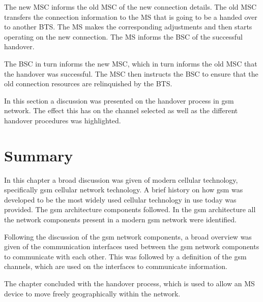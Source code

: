 \begin{description}
The new \gls{MSC} informs the old \gls{MSC} of the new connection details. The old \gls{MSC} transfers the connection information to the \gls{MS} that is going to be a handed over to another \gls{BTS}\@\cite{wirelesstelcoMullet}. The \gls{MS} makes the corresponding adjustments and then starts operating on the new connection. The \gls{MS} informs the \gls{BSC} of the successful handover\cite{wirelesstelcoMullet,GSMArchitectureProtocolsServices}. 

  The \gls{BSC} in turn informs the new \gls{MSC}, which in turn informs the old \gls{MSC} that the handover was successful. The \gls{MSC} then instructs the \gls{BSC} to ensure that the old connection resources are relinquished by the \gls{BTS}.
\end{description}

In this section a discussion was presented on the handover process in \gls{gsm} network. The effect this has on the channel selected as well as the different handover procedures was highlighted. 
\section{Summary}
In this chapter a broad discussion was given of modern cellular technology, specifically \gls{gsm} cellular network technology. A brief history on how \gls{gsm} was developed to be the most widely used cellular technology in use today was provided. The \gls{gsm} architecture components followed. In the \gls{gsm} architecture all the network components present in a modern \gls{gsm} network were identified.

Following the discussion of the \gls{gsm} network components, a broad overview was given of the communication interfaces used between the \gls{gsm} network components to communicate with each other. This was followed by a definition of the \gls{gsm} channels, which are used on the interfaces to communicate information.

The chapter concluded with the handover process, which is used to allow an \gls{MS} device to move freely geographically within the network. 
